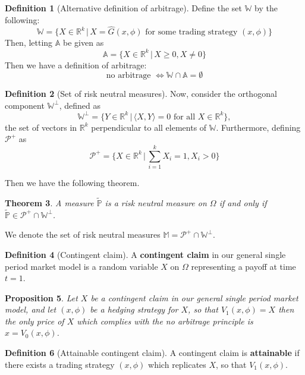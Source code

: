\documentclass[10pt, oneside, reqno]{amsart}
\theoremstyle{plain}%
\newtheorem{thm}{Theorem}[subsection]
\newtheorem{prop}[thm]{Proposition}
\theoremstyle{definition}
\newtheorem{defn}[thm]{Definition}
\theoremstyle{remark}
\newcommand{\given}{ \, | \,}
\newcommand{\R}{\mathbb{R}}
\newcommand{\rnm}{\tilde{\mathbb{P}}}
\begin{document}
\begin{defn}[Alternative definition of arbitrage]
    Define the set $\mathbb{W}$ by the following:\[
            \mathbb{W} = \{ X \in \R^k \given X = \hat{G}(x,\phi) \text{ for some trading strategy } (x,\phi) \}
        \]
        Then, letting $\mathbb{A}$ be given as \[
            \mathbb{A} = \{ X \in \R^k \given X \geq 0, X \neq 0 \}
        \]
        Then we have a definition of arbitrage:
        \[
            \text{no arbitrage } \iff \mathbb{W} \cap \mathbb{A} = \emptyset
        \]
\end{defn}  

\begin{defn}[Set of risk neutral measures]
    Now, consider the orthogonal component $\mathbb{W}^\perp$, defined as \[
        \mathbb{W}^\perp = \{ Y \in \R^k \given \langle X,Y \rangle = 0 \text{ for all } X \in \R^k \},
    \] the set of vectors in $\R^k$ perpendicular to all elements of $\mathbb{W}$.  Furthermore, defining $\mathcal{P}^+$ as\[
        \mathcal{P}^+  = \{ X \in \R^k \given \sum_{i = 1}^k X_i = 1, X_i > 0 \}
    \] 
\end{defn}
    
    Then we have the following theorem.
    \begin{thm}A measure $\rnm$ is a risk neutral measure on $\Omega$ if and only if $\rnm \in \mathcal{P}^+ \cap \mathbb{W}^\perp$.
    \end{thm}
    
    We denote the set of risk neutral measures $\mathbb{M} = \mathcal{P}^+ \cap \mathbb{W}^\perp$.




\begin{defn}[Contingent claim]
    A \textbf{contingent claim} in our general single period market model is a random variable $X$ on $\Omega$ representing a payoff at time $t = 1$.
\end{defn}

\begin{prop}
    Let $X$ be a contingent claim in our general single period market model, and let $(x,\phi)$ be a hedging strategy for $X$, so that $V_1(x,\phi) = X$ then the only price of $X$ which complies with the no arbitrage principle is $x = V_0(x,\phi)$.
\end{prop}


\begin{defn}[Attainable contingent claim]
    A contingent claim is \textbf{attainable} if there exists a trading strategy $(x,\phi)$ which replicates $X$, so that $V_1(x,\phi)$.
\end{defn}  
\end{document}
